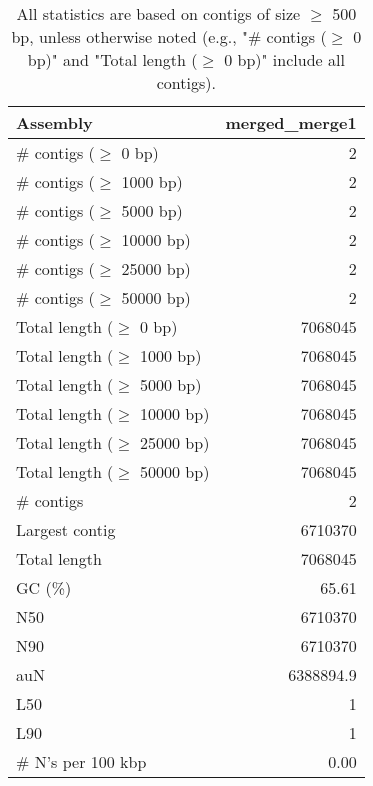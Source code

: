 \documentclass[12pt,a4paper]{article}
\begin{document}
\begin{table}[ht]
\begin{center}
\caption{All statistics are based on contigs of size $\geq$ 500 bp, unless otherwise noted (e.g., "\# contigs ($\geq$ 0 bp)" and "Total length ($\geq$ 0 bp)" include all contigs).}
\begin{tabular}{|l*{1}{|r}|}
\hline
Assembly & merged\_merge1 \\ \hline
\# contigs ($\geq$ 0 bp) & 2 \\ \hline
\# contigs ($\geq$ 1000 bp) & 2 \\ \hline
\# contigs ($\geq$ 5000 bp) & 2 \\ \hline
\# contigs ($\geq$ 10000 bp) & 2 \\ \hline
\# contigs ($\geq$ 25000 bp) & 2 \\ \hline
\# contigs ($\geq$ 50000 bp) & 2 \\ \hline
Total length ($\geq$ 0 bp) & 7068045 \\ \hline
Total length ($\geq$ 1000 bp) & 7068045 \\ \hline
Total length ($\geq$ 5000 bp) & 7068045 \\ \hline
Total length ($\geq$ 10000 bp) & 7068045 \\ \hline
Total length ($\geq$ 25000 bp) & 7068045 \\ \hline
Total length ($\geq$ 50000 bp) & 7068045 \\ \hline
\# contigs & 2 \\ \hline
Largest contig & 6710370 \\ \hline
Total length & 7068045 \\ \hline
GC (\%) & 65.61 \\ \hline
N50 & 6710370 \\ \hline
N90 & 6710370 \\ \hline
auN & 6388894.9 \\ \hline
L50 & 1 \\ \hline
L90 & 1 \\ \hline
\# N's per 100 kbp & 0.00 \\ \hline
\end{tabular}
\end{center}
\end{table}
\end{document}
